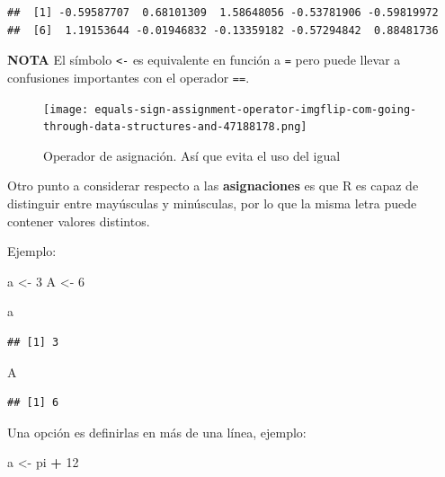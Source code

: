 \documentclass[
]{book}
\newenvironment{Shaded}{\begin{snugshade}}{\end{snugshade}}
\newcommand{\DecValTok}[1]{\textcolor[rgb]{0.00,0.00,0.81}{#1}}
\newcommand{\NormalTok}[1]{#1}
\newcommand{\OtherTok}[1]{\textcolor[rgb]{0.56,0.35,0.01}{#1}}
\newcommand{\SpecialCharTok}[1]{\textcolor[rgb]{0.81,0.36,0.00}{\textbf{#1}}}
\begin{document}
\begin{verbatim}
##  [1] -0.59587707  0.68101309  1.58648056 -0.53781906 -0.59819972
##  [6]  1.19153644 -0.01946832 -0.13359182 -0.57294842  0.88481736
\end{verbatim}

\textbf{NOTA} El símbolo \texttt{\textless{}-} es equivalente en función a \texttt{=} pero puede llevar a confusiones importantes con el operador \texttt{==}.

\begin{figure}
\centering
\texttt{[image: equals-sign-assignment-operator-imgflip-com-going-through-data-structures-and-47188178.png]}
\caption{Operador de asignación. Así que evita el uso del igual}
\end{figure}

Otro punto a considerar respecto a las \textbf{asignaciones} es que R es capaz de distinguir entre mayúsculas y minúsculas, por lo que la misma letra puede contener valores distintos.

Ejemplo:

\begin{Shaded}
\begin{Highlighting}[]
\NormalTok{a }\OtherTok{\textless{}{-}} \DecValTok{3}
\NormalTok{A }\OtherTok{\textless{}{-}} \DecValTok{6}
\end{Highlighting}
\end{Shaded}

\begin{Shaded}
\begin{Highlighting}[]
\NormalTok{a}
\end{Highlighting}
\end{Shaded}

\begin{verbatim}
## [1] 3
\end{verbatim}

\begin{Shaded}
\begin{Highlighting}[]
\NormalTok{A}
\end{Highlighting}
\end{Shaded}

\begin{verbatim}
## [1] 6
\end{verbatim}

Una opción es definirlas en más de una línea, ejemplo:

\begin{Shaded}
\begin{Highlighting}[]
\NormalTok{a }\OtherTok{\textless{}{-}}
\NormalTok{  pi }\SpecialCharTok{+} \DecValTok{12}
\end{Highlighting}
\end{Shaded}
\end{document}
